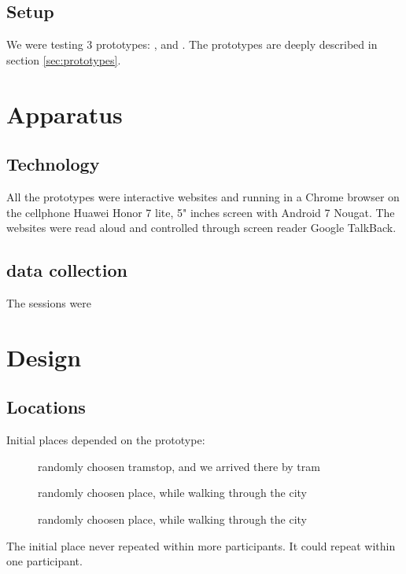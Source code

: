 \documentclass[11pt,twoside,a4paper]{book}
\begin{document}
	\subsection{Setup}
	We were testing 3 prototypes: \poi{}, \reversegeo{} and \gps{}. The prototypes are deeply described in section \ref{sec:prototypes}. 
	\subsection{}
	\section{Apparatus}
	\subsection{Technology}
	All the prototypes were interactive websites and running in a Chrome browser on the cellphone Huawei Honor 7 lite, 5" inches screen with Android 7 Nougat. The websites were read aloud and controlled through screen reader Google TalkBack\cite{later}.
	\subsection{data collection}
	The sessions were
	
	\section{Design}
	\subsection{Locations}
	Initial places depended on the prototype:
	\begin{description}
		\item [\poi{}] randomly choosen tramstop, and we arrived there by tram
		\item [\reversegeo{}] randomly choosen place, while walking through the city
		\item [\gps{}] randomly choosen place, while walking through the city
	\end{description}
	
	The initial place never repeated within more participants. It could repeat within one participant.
\end{document}

